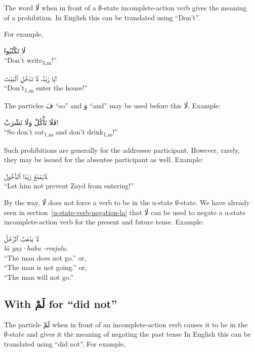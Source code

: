 \documentclass[
  10pt,
]{book}
\begin{document}
The word \foreignlanguage{arabic}{لَا} when in front of a
\(\emptyset\)-state
incomplete-action verb
gives the meaning of a prohibition.
In English this can be translated using \enquote{Don't}.

For example,

\foreignlanguage{arabic}{لَا تَکْتُبُوا}\\
\enquote{Don't write\textsubscript{3,m}!}

\foreignlanguage{arabic}{يَا زَيْدُ، لَا تَدْخُلِ ٱلْبَيْتَ!}\\
\enquote{Don't\textsubscript{1,m} enter the house!}

The particles \foreignlanguage{arabic}{فَ} \enquote{so} and \foreignlanguage{arabic}{وَ} \enquote{and} may be used before this \foreignlanguage{arabic}{لَا}.
Example:

\foreignlanguage{arabic}{فَلَا تَأْکُلْ وَلَا تَشْرَبْ!}\\
\enquote{So don't eat\textsubscript{1,m} and don't drink\textsubscript{1,m}!}

Such prohibitions are generally for the addressee participant.
However, rarely, they may be issued for the absentee participant as well. Example:

\foreignlanguage{arabic}{لَايَمْنَعْ زَيْدًا ٱلدُّخُولَ.}\\
\enquote{Let him not prevent Zayd from entering!}

By the way, \foreignlanguage{arabic}{لَا} does not force a verb to be in the u-state
\(\emptyset\)-state. We have already seen in
section~\ref{u-state-verb-negation-la}
that \foreignlanguage{arabic}{لَا} can be used to negate a u-state incomplete-action verb for the present and future tense.
Example:

\foreignlanguage{arabic}{لَا يَذْهَبُ ٱلرَّجُلُ}\\
\emph{lā yaẕ·habu -rrajulu.}\\
\enquote{The man does not go.} or,\\
\enquote{The man is not going.} or,\\
\enquote{The man will not go.}

\subsection{\texorpdfstring{With \foreignlanguage{arabic}{لَمْ} for \enquote{did not}}{With لَمْ for ``did not''}}\label{with-ux644ux645-for-did-not}

The particle \foreignlanguage{arabic}{لَمْ} when in front of an
incomplete-action verb
causes it to be in the
\(\emptyset\)-state
and gives it the meaning of
negating the past tense
In English this can be translated using \enquote{did not}.
For example,
\end{document}
